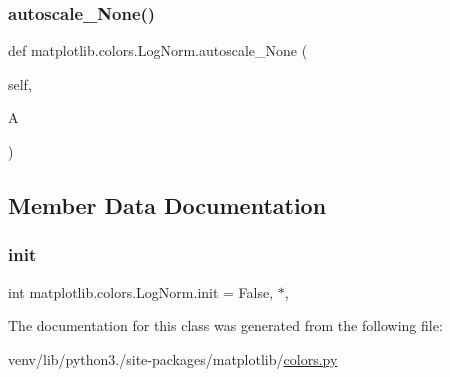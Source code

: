 \subsubsection{\texorpdfstring{autoscale\+\_\+\+None()}{autoscale\_None()}}
{\footnotesize\ttfamily def matplotlib.\+colors.\+Log\+Norm.\+autoscale\+\_\+\+None (\begin{DoxyParamCaption}\item[{}]{self,  }\item[{}]{A }\end{DoxyParamCaption})}



\subsection{Member Data Documentation}
\mbox{\label{classmatplotlib_1_1colors_1_1LogNorm_a1d80e624549db40949cd34a52d666743}} 
\subsubsection{\texorpdfstring{init}{init}}
{\footnotesize\ttfamily int matplotlib.\+colors.\+Log\+Norm.\+init = False, $\ast$,\hspace{0.3cm}{\ttfamily [static]}}



The documentation for this class was generated from the following file\+:\begin{DoxyCompactItemize}
\item 
venv/lib/python3./site-\/packages/matplotlib/\hyperlink{colors_8py}{colors.\+py}\end{DoxyCompactItemize}
